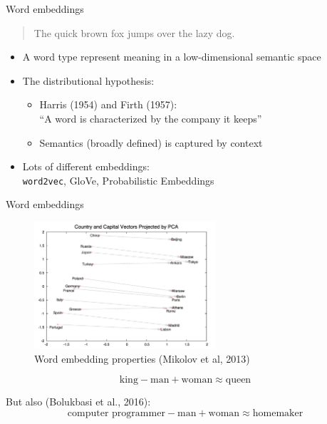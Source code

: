 \documentclass[10pt]{beamer}
\begin{document}
\begin{frame}{Word embeddings}

\begin{quote}%
  The quick brown fox jumps over the lazy dog.
\end{quote}

\begin{itemize}
\item A word type represent {\color{uured} meaning in a low-dimensional semantic space}
\item The distributional hypothesis:
\begin{itemize}
  \item Harris (1954) and Firth (1957): \\ ``A word is characterized by the company it keeps''
  \item Semantics (broadly defined) is captured by  {\color{uured} context}
\end{itemize}
\item Lots of different embeddings: \\ \texttt{word2vec}, GloVe, Probabilistic Embeddings
\end{itemize}


\end{frame}


\begin{frame}{Word embeddings}

\begin{figure}[h]
\centering
\includegraphics[width=0.6\textwidth]{fig/Mikolov_2013_word_projections.png}
\caption{Word embedding properties (Mikolov et al, 2013)}
\end{figure}
\[
\text{king} - \text{man} + \text{woman} \approx \text{queen}
\]

\pause
But also (Bolukbasi et al., 2016):
\[
\text{computer programmer} - \text{man} + \text{woman} \approx \text{homemaker}
\]


\end{frame}
\end{document}
